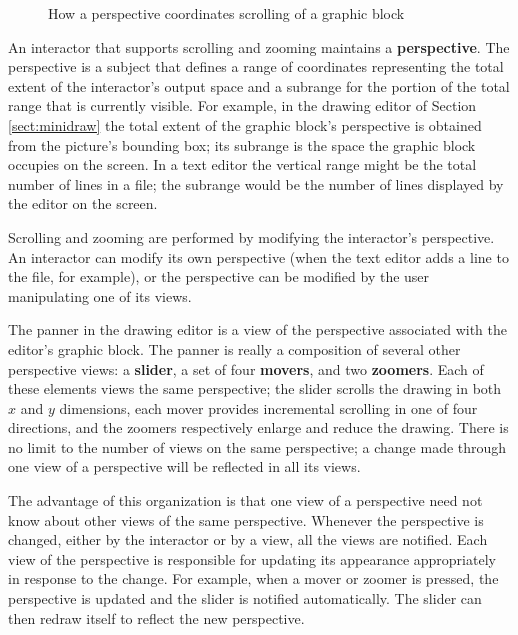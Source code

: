 \begin{figure*}
\vspace{3.5in}
\vspace{1ex}
\caption{How a perspective coordinates scrolling of a graphic block}
\label{subjview:schematic}
\end{figure*}

An interactor that supports
scrolling and zooming
maintains a {\bf perspective}.  The perspective is a subject that defines a
range of coordinates representing the total extent
of the interactor's output space
and a subrange for the portion of the total range that is currently visible.
For example, in the drawing editor of Section \ref{sect:minidraw}
the total extent of the graphic block's
perspective is obtained from the picture's bounding box; its subrange is the
space the graphic block occupies on the screen.  In a text editor the vertical
range might be the total number of lines in a file; the subrange would
be the number of lines displayed by the editor on the screen.

Scrolling and zooming are performed by modifying the interactor's
perspective.  An interactor can modify its own perspective (when the text
editor adds a line to the file, for example), or the perspective can be
modified by the user manipulating one of its views.

The panner in the drawing editor is a view of the perspective
associated with the editor's graphic block.  The panner is really a
composition of several other perspective views: a {\bf slider}, a set
of four {\bf movers}, and two {\bf zoomers}.  Each of these elements
views the same perspective; the slider scrolls the drawing in both $x$
and $y$ dimensions, each mover provides incremental scrolling in one of
four directions, and the zoomers respectively enlarge and reduce the
drawing.  There is no limit to the number of views on the same
perspective; a change made through one view of a perspective will be
reflected in all its views.

The advantage of this organization is that one view of a perspective
need not know about other views of the same perspective.  Whenever the
perspective is changed, either by the interactor or by a view, all the
views are notified. Each view of the perspective is responsible for
updating its appearance appropriately in response to the change.  For
example,
when a mover or zoomer is pressed, the perspective is
updated and the slider is notified automatically.  The slider can then
redraw itself to reflect the new perspective.

